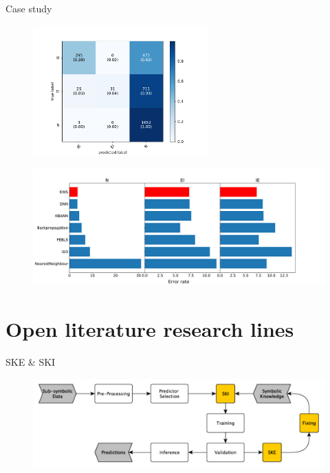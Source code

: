 \documentclass[presentation]{beamer}\mode<presentation>{\usetheme{AMSBolognaFC}}
\begin{document}
\begin{frame}{Case study}
    \begin{figure}
        \centering
        \includegraphics[width=0.6\textwidth]{figures/dna-rules-confusion-matrix}
    \end{figure}
    
    \framebreak
    
    \begin{figure}
        \centering
        \includegraphics[width=\textwidth]{figures/kins-error-rate}
    \end{figure}
    
\end{frame}


\section{Open literature research lines}


\begin{frame}[c]{SKE \& SKI}
    \begin{figure}
        \centering
        \includegraphics[width=\textwidth]{figures/ske-ski-workflow}
    \end{figure}
\end{frame}
\end{document}
